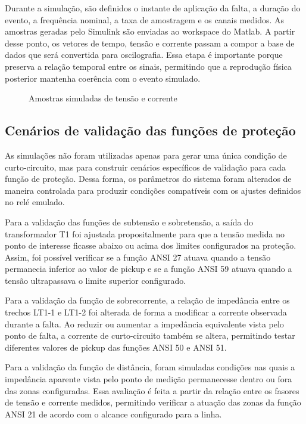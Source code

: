 Durante a simulação, são definidos o instante de aplicação da falta, a duração do evento, a frequência nominal, a taxa de amostragem e os canais medidos. As amostras geradas pelo Simulink são enviadas ao workspace do Matlab. A partir desse ponto, os vetores de tempo, tensão e corrente passam a compor a base de dados que será convertida para oscilografia. Essa etapa é importante porque preserva a relação temporal entre os sinais, permitindo que a reprodução física posterior mantenha coerência com o evento simulado.

\begin{figure}[H]
  \centering
  \caption{Amostras simuladas de tensão e corrente}
  \label{fig:amostras-simulink}


\end{figure}

\subsection{Cenários de validação das funções de proteção}

As simulações não foram utilizadas apenas para gerar uma única condição de curto-circuito, mas para construir cenários específicos de validação para cada função de proteção. Dessa forma, os parâmetros do sistema foram alterados de maneira controlada para produzir condições compatíveis com os ajustes definidos no relé emulado.

Para a validação das funções de subtensão e sobretensão, a saída do transformador T1 foi ajustada propositalmente para que a tensão medida no ponto de interesse ficasse abaixo ou acima dos limites configurados na proteção. Assim, foi possível verificar se a função ANSI 27 atuava quando a tensão permanecia inferior ao valor de pickup e se a função ANSI 59 atuava quando a tensão ultrapassava o limite superior configurado.

Para a validação da função de sobrecorrente, a relação de impedância entre os trechos LT1-1 e LT1-2 foi alterada de forma a modificar a corrente observada durante a falta. Ao reduzir ou aumentar a impedância equivalente vista pelo ponto de falta, a corrente de curto-circuito também se altera, permitindo testar diferentes valores de pickup das funções ANSI 50 e ANSI 51.

Para a validação da função de distância, foram simuladas condições nas quais a impedância aparente vista pelo ponto de medição permanecesse dentro ou fora das zonas configuradas. Essa avaliação é feita a partir da relação entre os fasores de tensão e corrente medidos, permitindo verificar a atuação das zonas da função ANSI 21 de acordo com o alcance configurado para a linha.

